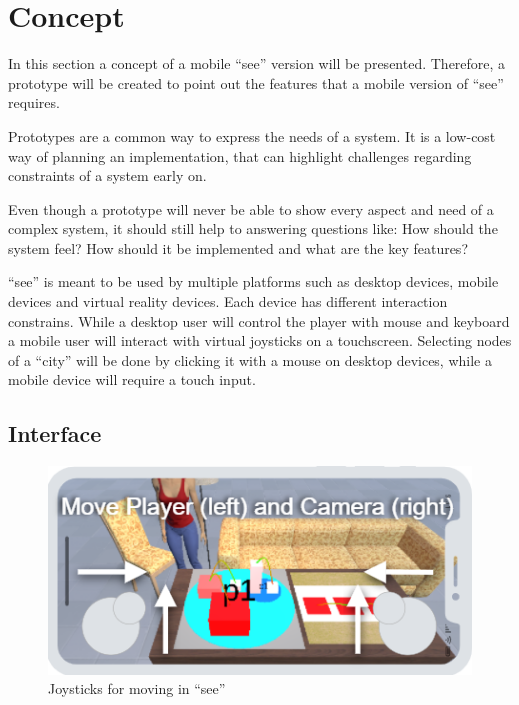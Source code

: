 \section{Concept}
In this section a concept of a mobile \enquote{\gls{see}} version will be presented. 
Therefore, a prototype will be created to point out the features that a mobile version of \enquote{\gls{see}} requires.

Prototypes are a common way to express the needs of a system. 
It is a low-cost way of planning an implementation, that can highlight challenges regarding constraints of a system early on.

Even though a prototype will never be able to show every aspect and need of a complex system, it should still help to answering questions like: 
How should the system feel? How should it be implemented and what are the key features? \cite{houde1997prototypes} 

\enquote{\gls{see}} is meant to be used by multiple platforms such as desktop devices, mobile devices and virtual reality devices.
Each device has different interaction constrains. 
While a desktop user will control the player with mouse and keyboard a mobile user will interact with virtual joysticks on a touchscreen.
Selecting nodes of a \enquote{\gls{city}} will be done by clicking it with a mouse on desktop devices, while a mobile device will require a touch input.

\subsection{Interface}

\begin{figure}[htb]
    \centering
    \includegraphics[width=1\textwidth]{Concept/img/joystick.png}
    \caption{Joysticks for moving in \enquote{\gls{see}}}\label{fig:joystick}
\end{figure}

